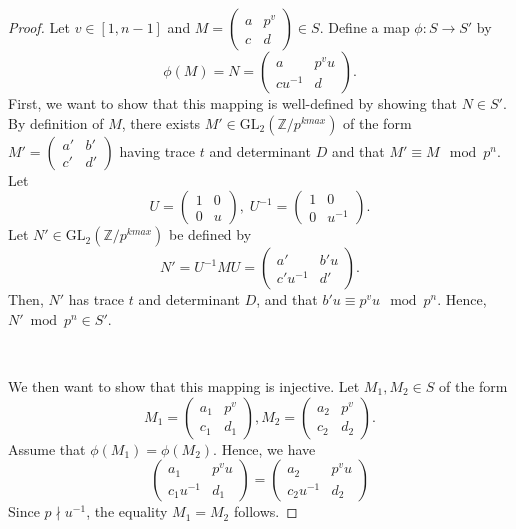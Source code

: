 \documentclass[letterpaper,12pt]{article}
\newcommand{\Z}{\mathbb{Z}}
\begin{document}
\begin{proof}
Let $v \in [1, n-1]$ and $M = \begin{pmatrix}
a & p^v \\ c & d
\end{pmatrix} \in S$.
Define a map $\phi: S \to S'$ by 
\[
\phi(M) = N = \begin{pmatrix}
a & p^vu \\ cu^{-1} & d
\end{pmatrix}.
\]
First, we want to show that this mapping is well-defined 
by showing that $N \in S'$.
By definition of $M$, there exists $M' \in \text{GL}_2(\Z/p^{kmax})$
of the form $M' = \begin{pmatrix}
a' & b' \\ c' & d'
\end{pmatrix}$ having trace $t$ and determinant $D$ and
that $M' \equiv M \mod p^n$.
Let 
\[
U = \begin{pmatrix}
1 & 0 \\ 0 & u
\end{pmatrix}, \;
U^{-1} = \begin{pmatrix}
1 & 0 \\ 0 & u^{-1}
\end{pmatrix}.
\]
Let $N' \in \text{GL}_2(\Z/p^{kmax})$ be defined by 
\[
N' = U^{-1}MU 
= \begin{pmatrix}
a' & b'u \\ c'u^{-1} & d'
\end{pmatrix}.
\]
Then, $N'$ has trace $t$ and determinant $D$, and that 
$b'u \equiv p^v u \mod p^n$.
Hence, $N' \bmod p^n \in S'$.

\

We then want to show that this mapping is injective.
Let $M_1, M_2 \in S$ of the form 
\[
M_1 = \begin{pmatrix}
a_1 & p^v \\ c_1 & d_1
\end{pmatrix}, 
M_2 = \begin{pmatrix}
a_2 & p^v \\ c_2 & d_2
\end{pmatrix}.
\]
Assume that $\phi(M_1) = \phi(M_2)$.
Hence, we have 
\[
\begin{pmatrix}
a_1 & p^v u \\ c_1u^{-1} & d_1
\end{pmatrix} = \begin{pmatrix}
a_2 & p^v u \\ c_2u^{-1} & d_2
\end{pmatrix}
\]  
Since $p \nmid u^{-1}$, the equality $M_1 = M_2$ follows.


\end{proof}
\end{document}
